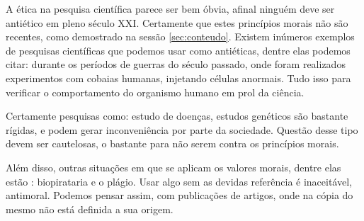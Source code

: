 \documentclass[12pt]{article}
\begin{document}
A ética na pesquisa científica parece ser bem óbvia, afinal ninguém deve ser antiético em pleno século XXI. Certamente que estes princípios morais não são recentes, como demostrado na sessão \ref{sec:conteudo}. Existem inúmeros exemplos de pesquisas científicas que podemos usar como antiéticas, dentre elas podemos citar: durante os períodos de guerras do século passado, onde foram realizados experimentos com cobaias humanas, injetando células anormais. Tudo isso para verificar o comportamento do organismo humano em prol da ciência. 

Certamente pesquisas como: estudo de doenças, estudos genéticos são bastante rígidas, e podem gerar inconveniência por parte da sociedade. Questão desse tipo devem ser cautelosas, o bastante para não serem contra os princípios morais.

Além disso, outras situações em que se aplicam os valores morais, dentre elas estão : biopirataria e o plágio. Usar algo sem as devidas referência é inaceitável, antimoral. Podemos pensar assim, com publicações de artigos, onde na cópia do mesmo não está definida a sua origem.







 



\end{document}
